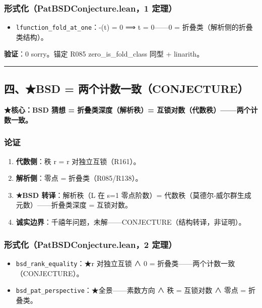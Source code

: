 \documentclass[
]{article}
\providecommand{\tightlist}{%
  \setlength{\itemsep}{0pt}\setlength{\parskip}{0pt}}
\begin{document}
\subsubsection{形式化（PatBSDConjecture.lean，1
定理）}\label{ux5f62ux5f0fux5316patbsdconjecture.lean1-ux5b9aux7406-2}

\begin{itemize}
\tightlist
\item
  \texttt{lfunction\_fold\_at\_one}：-(t) = 0 ⟹ t = 0------0 =
  折叠类（解析侧的折叠类结构）。
\end{itemize}

\textbf{验证}：0 sorry。锚定 R085 zero\_is\_fold\_class 同型 +
linarith。

\begin{center}\rule{0.5\linewidth}{0.5pt}\end{center}

\subsection{四、★BSD =
两个计数一致（CONJECTURE）}\label{ux56dbbsd-ux4e24ux4e2aux8ba1ux6570ux4e00ux81f4conjecture}

\textbf{★核心：BSD 猜想 = 折叠类深度（解析秩）=
互锁对数（代数秩）------两个计数一致。}

\subsubsection{论证}\label{ux8bbaux8bc1-3}

\begin{enumerate}
\def\labelenumi{\arabic{enumi}.}
\tightlist
\item
  \textbf{代数侧}：秩 r = r 对独立互锁（R161）。
\item
  \textbf{解析侧}：零点 = 折叠类（R085/R138）。
\item
  \textbf{★BSD 转译}：解析秩（L 在 s=1 零点阶数）=
  代数秩（莫德尔-威尔群生成元数）------折叠类深度 = 互锁对数。
\item
  \textbf{诚实边界}：千禧年问题，未解------CONJECTURE（结构转译，非证明）。
\end{enumerate}

\subsubsection{形式化（PatBSDConjecture.lean，2
定理）}\label{ux5f62ux5f0fux5316patbsdconjecture.lean2-ux5b9aux7406}

\begin{itemize}
\tightlist
\item
  \texttt{bsd\_rank\_equality}：★r 对独立互锁 ∧ 0 =
  折叠类------两个计数一致（CONJECTURE）。
\item
  \texttt{bsd\_pat\_perspective}：★全景------素数方向 ∧ 秩 = 互锁对数 ∧
  零点 = 折叠类。
\end{itemize}
\end{document}
